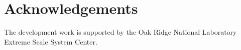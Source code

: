 \section*{Acknowledgements}

The \openshmem development work is supported by the Oak Ridge National
Laboratory Extreme Scale System Center.

%
%

{\large \pagebreak{}}
